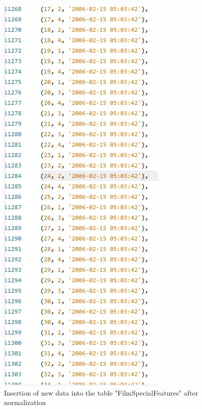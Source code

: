 \documentclass{article}
\begin{document}
\begin{figure}[H]
			\includegraphics[width=\textwidth]{filmspecialfeatures2_insert_norm}
			\caption{Insertion of new data into the table "Film\textunderscore Special\textunderscore Features" after normalization}
		\end{figure}
\end{document}
